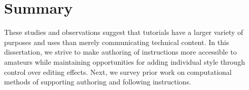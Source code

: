 
\section{Summary}

These studies and observations suggest that tutorials have a larger variety of purposes and uses than merely communicating technical content.
%
In this dissertation, we strive to make authoring of instructions more accessible to amateurs while maintaining opportunities for adding individual style through control over editing effects.
%
Next, we survey prior work on computational methods of supporting authoring and following instructions.
